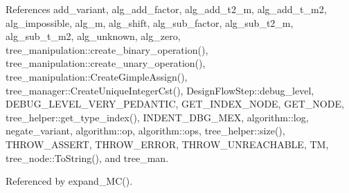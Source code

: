 References add\+\_\+variant, alg\+\_\+add\+\_\+factor, alg\+\_\+add\+\_\+t2\+\_\+m, alg\+\_\+add\+\_\+t\+\_\+m2, alg\+\_\+impossible, alg\+\_\+m, alg\+\_\+shift, alg\+\_\+sub\+\_\+factor, alg\+\_\+sub\+\_\+t2\+\_\+m, alg\+\_\+sub\+\_\+t\+\_\+m2, alg\+\_\+unknown, alg\+\_\+zero, tree\+\_\+manipulation\+::create\+\_\+binary\+\_\+operation(), tree\+\_\+manipulation\+::create\+\_\+unary\+\_\+operation(), tree\+\_\+manipulation\+::\+Create\+Gimple\+Assign(), tree\+\_\+manager\+::\+Create\+Unique\+Integer\+Cst(), Design\+Flow\+Step\+::debug\+\_\+level, D\+E\+B\+U\+G\+\_\+\+L\+E\+V\+E\+L\+\_\+\+V\+E\+R\+Y\+\_\+\+P\+E\+D\+A\+N\+T\+IC, G\+E\+T\+\_\+\+I\+N\+D\+E\+X\+\_\+\+N\+O\+DE, G\+E\+T\+\_\+\+N\+O\+DE, tree\+\_\+helper\+::get\+\_\+type\+\_\+index(), I\+N\+D\+E\+N\+T\+\_\+\+D\+B\+G\+\_\+\+M\+EX, algorithm\+::log, negate\+\_\+variant, algorithm\+::op, algorithm\+::ops, tree\+\_\+helper\+::size(), T\+H\+R\+O\+W\+\_\+\+A\+S\+S\+E\+RT, T\+H\+R\+O\+W\+\_\+\+E\+R\+R\+OR, T\+H\+R\+O\+W\+\_\+\+U\+N\+R\+E\+A\+C\+H\+A\+B\+LE, TM, tree\+\_\+node\+::\+To\+String(), and tree\+\_\+man.



Referenced by expand\+\_\+\+M\+C().

